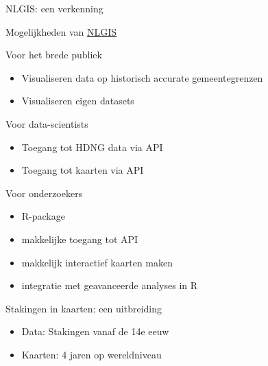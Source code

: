 \documentclass[ignorenonframetext,]{beamer}
\begin{document}
\begin{frame}{NLGIS: een verkenning}

Mogelijkheden van \href{http://nlgis.nl}{NLGIS}

\begin{block}{Voor het brede publiek}

\begin{itemize}
\itemsep1pt\parskip0pt
\item
  Visualiseren data op historisch accurate gemeentegrenzen
\item
  Visualiseren eigen datasets
\end{itemize}

\end{block}

\begin{block}{Voor data-scientists}

\begin{itemize}
\itemsep1pt\parskip0pt
\item
  Toegang tot HDNG data via API
\item
  Toegang tot kaarten via API
\end{itemize}

\end{block}

\begin{block}{Voor onderzoekers}

\begin{itemize}
\itemsep1pt\parskip0pt
\item
  R-package
\item
  makkelijke toegang tot API
\item
  makkelijk interactief kaarten maken
\item
  integratie met geavanceerde analyses in R
\end{itemize}

\end{block}

\end{frame}

\begin{frame}{Stakingen in kaarten: een uitbreiding}

\begin{itemize}
\itemsep1pt\parskip0pt
\item
  Data: Stakingen vanaf de 14e eeuw
\item
  Kaarten: 4 jaren op wereldniveau
\end{itemize}

\end{frame}
\end{document}
